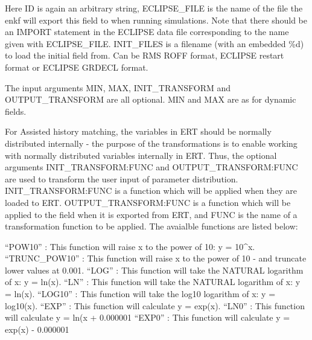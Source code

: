 \documentclass[a4paper,10pt,english]{sphinxmanual}
\begin{document}
\begin{sphinxShadowBox}
%
\begin{sphinxVerbatim}[commandchars=\\\{\}]
             
\end{sphinxVerbatim}

Here ID is again an arbitrary string, ECLIPSE\_FILE is the name of the file the
enkf will export this field to when running simulations. Note that there
should be an IMPORT statement in the ECLIPSE data file corresponding to the
name given with ECLIPSE\_FILE. INIT\_FILES is a filename (with an embedded \%d)
to load the initial field from. Can be RMS ROFF format, ECLIPSE restart format
or ECLIPSE GRDECL format.

The input arguments MIN, MAX, INIT\_TRANSFORM and OUTPUT\_TRANSFORM are all
optional. MIN and MAX are as for dynamic fields.

For Assisted history matching, the variables in ERT should be normally
distributed internally - the purpose of the transformations is to enable
working with normally distributed variables internally in ERT. Thus, the
optional arguments INIT\_TRANSFORM:FUNC and OUTPUT\_TRANSFORM:FUNC are used to
transform the user input of parameter distribution. INIT\_TRANSFORM:FUNC is a
function which will be applied when they are loaded to ERT.
OUTPUT\_TRANSFORM:FUNC is a function which will be applied to the field when it
is exported from ERT, and FUNC is the name of a transformation function to be
applied. The avaialble functions are listed below:

“POW10”       : This function will raise x to the power of 10: y = 10\textasciicircum{}x.
“TRUNC\_POW10” : This function will raise x to the power of 10 - and truncate lower values at 0.001.
“LOG”         : This function will take the NATURAL logarithm of x: y = ln(x).
“LN”          : This function will take the NATURAL logarithm of x: y = ln(x).
“LOG10”       : This function will take the log10 logarithm of x: y = log10(x).
“EXP”         : This function will calculate y = exp(x).
“LN0”         : This function will calculate y = ln(x + 0.000001
“EXP0”        : This function will calculate y = exp(x) - 0.000001


\end{sphinxShadowBox}
\end{document}
